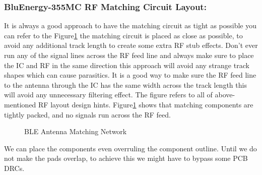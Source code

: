 \subsubsection{BluEnergy-355MC RF Matching Circuit Layout:}
It is always a good approach to have the matching circuit as tight as possible you can refer to the Figure\ref{fig:Antenna_matching_network} the matching circuit is placed as close as possible, to avoid any additional track length to create some extra RF stub effects.  Don't ever run any of the signal lines across the RF feed line and always make sure to place the IC and RF in the same direction this approach will avoid any strange track shapes which can cause parasitics. It is a good way to make sure the RF feed line to the antenna through the IC has the same width across the track length this will avoid any unnecessary filtering effect. The figure refers to all of above-mentioned RF layout design hints.
Figure\ref{fig:Antenna_matching_network} shows that matching components are tightly packed, and no signals run across the RF feed.

\begin{figure}[h]
	\centering
	\qquad
	\caption{BLE Antenna Matching Network}
	\centering
	\label{fig:Antenna_matching_network}
\end{figure}
We can place the components even overruling the component outline. Until we do not make the pads overlap, to achieve this we might have to bypass some PCB DRCs.

